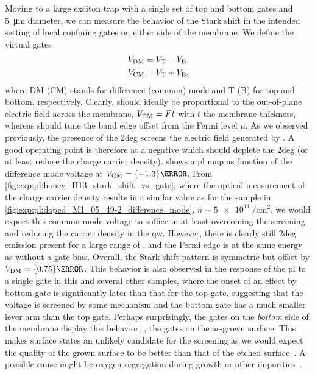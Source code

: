 Moving to a large exciton trap with a single set of top and bottom gates and \qty{5}{\micro\meter} diameter, we can measure the behavior of the Stark shift in the intended setting of local confining gates on either side of the membrane.
We define the virtual gates
\begin{align}\label{eq:exp:observations:virtual_gates}
    V_{\mathrm{DM}} &= V_{\mathrm{T}} - V_{\mathrm{B}}, \\
    V_{\mathrm{CM}} &= V_{\mathrm{T}} + V_{\mathrm{B}},
\end{align}
where DM (CM) stands for difference (common) mode and T (B) for top and bottom, respectively.
Clearly, \VDM should ideally be proportional to the out-of-plane electric field across the membrane, $V_{\mathrm{DM}} = Ft$ with $t$ the membrane thickness, whereas \VCM should tune the band edge offset from the Fermi level $\mu$.
As we observed previously, the presence of the \gls{2deg} screens the electric field generated by \VDM.
A good operating point is therefore at a negative \VCM which should deplete the \gls{2deg} (or at least reduce the charge carrier density).
 shows a \gls{pl} map as function of the difference mode voltage \VDM at $\VCM = \qty{-1.3}{\volt}$.
From \cref{fig:exp:pl:honey_H13_stark_shift_vs_gate}, where the optical measurement of the charge carrier density results in a similar value as for the sample in \cref{fig:exp:pl:doped_M1_05_49-2_difference_mode}, $n\sim\qty{5e11}{\per\centi\meter\squared}$, we would expect this common mode voltage to suffice in at least overcoming the screening and reducing the carrier density in the \gls{qw}.
However, there is clearly still \gls{2deg} emission present for a large range of \VDM, and the Fermi edge is at the same energy as without a gate bias.
Overall, the Stark shift pattern is symmetric but offset by $\VDM = \qty{0.75}{\volt}$.
This behavior is also observed in the response of the \gls{pl} to a single gate in this and several other samples, where the onset of an effect by bottom gate is significantly later than that for the top gate, suggesting that the voltage is screened by some mechanism and the bottom gate has a much smaller lever arm than the top gate.
Perhaps surprisingly, the gates on the \emph{bottom} side of the membrane display this behavior, \ie, the gates on the as-grown surface.
This makes surface states an unlikely candidate for the screening as we would expect the quality of the grown surface to be better than that of the etched surface~\cite{Descamps2021}.
A possible cause might be oxygen segregation during growth or other impurities~\cite{Nguyen2020}.

